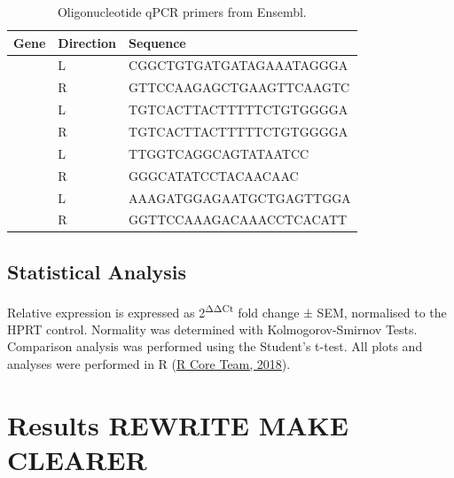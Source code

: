 \documentclass[
  11pt,
]{article}
\begin{document}
\begin{table}[!h]

\caption{\label{tab:primers}Oligonucleotide qPCR primers from Ensembl.}
\begin{tabu} to 
\toprule
Gene & Direction & Sequence\\
\midrule
 & L & CGGCTGTGATGATAGAAATAGGGA\\

 & R & GTTCCAAGAGCTGAAGTTCAAGTC\\

 & L & TGTCACTTACTTTTTCTGTGGGGA\\

 & R & TGTCACTTACTTTTTCTGTGGGGA\\

 & L & TTGGTCAGGCAGTATAATCC\\

 & R & GGGCATATCCTACAACAAC\\

 & L & AAAGATGGAGAATGCTGAGTTGGA\\

 & R & GGTTCCAAAGACAAACCTCACATT\\
\bottomrule
\end{tabu}
\end{table}

\hypertarget{statistical-analysis}{%
\subsection{Statistical Analysis}\label{statistical-analysis}}

Relative expression is expressed as 2\textsuperscript{ΔΔCt} fold change ± SEM, normalised to the HPRT control.
Normality was determined with Kolmogorov-Smirnov Tests.
Comparison analysis was performed using the Student's t-test.
All plots and analyses were performed in R (\protect\hyperlink{ref-R}{R Core Team, 2018}).

\hypertarget{results-rewrite-make-clearer}{%
\section{Results REWRITE MAKE CLEARER}\label{results-rewrite-make-clearer}}
\end{document}
